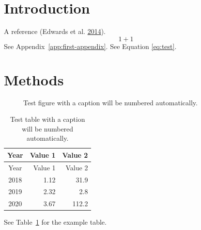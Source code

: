 \documentclass[12pt]{article}\usepackage[]{graphicx}\usepackage[]{color}
\begin{document}

\frontmatter


\renewcommand{\headrulewidth}{0.5pt}  %
\renewcommand{\footrulewidth}{0.5pt}  %

\hypertarget{introduction}{%
\section{Introduction}\label{introduction}}

A reference (Edwards et al. \protect\hyperlink{ref-edwards2013}{2014}).
\begin{equation}
  1 + 1
  \label{eq:test}
\end{equation}
See Appendix~\ref{app:first-appendix}. See Equation \eqref{eq:test}.

\hypertarget{methods}{%
\section{Methods}\label{methods}}
\begin{figure}[htb]

{\centering {} 

}

\caption{Test figure with a caption will be numbered automatically.}\label{fig:testfig}
\end{figure}
\begin{longtable}[]{@{}crr@{}}
\caption{\label{tab:testtab}Test table with a caption will be numbered automatically.}\tabularnewline
\toprule
Year & Value 1 & Value 2\tabularnewline
\midrule
\endfirsthead
\toprule
Year & Value 1 & Value 2\tabularnewline
\midrule
\endhead
2018 & 1.12 & 31.9\tabularnewline
2019 & 2.32 & 2.8\tabularnewline
2020 & 3.67 & 112.2\tabularnewline
\bottomrule
\end{longtable}
See Table~\ref{tab:testtab} for the example table.
\end{document}
